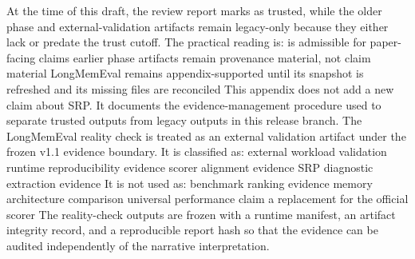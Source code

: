 {}At the time of this draft, the review report marks  as trusted, while the older phase and external-validation artifacts remain legacy-only because they either lack  or predate the trust cutoff.\markdownRendererParagraphSeparator
{}The practical reading is:\markdownRendererInterblockSeparator
{}\markdownRendererUlBeginTight
\markdownRendererUlItem {} is admissible for paper-facing claims\markdownRendererUlItemEnd 
\markdownRendererUlItem earlier phase artifacts remain provenance material, not claim material\markdownRendererUlItemEnd 
\markdownRendererUlItem LongMemEval remains appendix-supported until its snapshot is refreshed and its missing files are reconciled\markdownRendererUlItemEnd 
\markdownRendererUlEndTight \markdownRendererInterblockSeparator
{}This appendix does not add a new claim about SRP.\markdownRendererSoftLineBreak
{}It documents the evidence-management procedure used to separate trusted outputs from legacy outputs in this release branch.\markdownRendererInterblockSeparator
{}
\markdownRendererSectionEnd \markdownRendererSectionBegin
{}\markdownRendererInterblockSeparator
{}The LongMemEval reality check is treated as an external validation artifact under the frozen v1.1 evidence boundary.\markdownRendererParagraphSeparator
{}It is classified as:\markdownRendererInterblockSeparator
{}\markdownRendererUlBeginTight
\markdownRendererUlItem external workload validation\markdownRendererUlItemEnd 
\markdownRendererUlItem runtime reproducibility evidence\markdownRendererUlItemEnd 
\markdownRendererUlItem scorer alignment evidence\markdownRendererUlItemEnd 
\markdownRendererUlItem SRP diagnostic extraction evidence\markdownRendererUlItemEnd 
\markdownRendererUlEndTight \markdownRendererInterblockSeparator
{}It is not used as:\markdownRendererInterblockSeparator
{}\markdownRendererUlBeginTight
\markdownRendererUlItem benchmark ranking evidence\markdownRendererUlItemEnd 
\markdownRendererUlItem memory architecture comparison\markdownRendererUlItemEnd 
\markdownRendererUlItem universal performance claim\markdownRendererUlItemEnd 
\markdownRendererUlItem a replacement for the official scorer\markdownRendererUlItemEnd 
\markdownRendererUlEndTight \markdownRendererInterblockSeparator
{}The reality-check outputs are frozen with a runtime manifest, an artifact integrity record, and a reproducible report hash so that the evidence can be audited independently of the narrative interpretation.\markdownRendererParagraphSeparator
